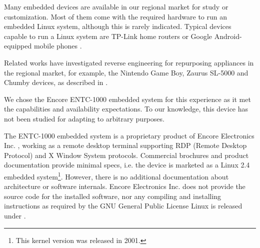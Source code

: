\documentclass[conference]{IEEEtran}
\newcommand{\nota}[1]{}
\begin{document}
\nota{Existen decenas de dispositivos embebidos en el mercado regional,
que pueden adquirirse para su estudio y adaptación. Y,
aunque muchas veces no se encuentren visiblemente etiquetados o documentados,
gran parte de estos sistemas contienen el hardware necesario
para ejecutar un sistema operativo Linux embebido. Ejemplos de estos dispositivos
capaces de ejecutar un sistema Linux son los routers hogareños TP-Link,
y los teléfonos móviles con sistema Google Android \cite{android}.
}
Many embedded devices are available in our regional market for study or customization. Most of them come with the required hardware to run an embedded Linux system, although this is rarely indicated.
Typical devices capable to run a Linux system are TP-Link home routers or Google Android-equipped mobile phones \cite{android, tplink}.

Related works have investigated
reverse engineering for repurposing appliances in the regional market,
for example, the Nintendo Game Boy, Zaurus SL-5000 and Chumby devices,
as described in \cite{camargo1, camargo2, castillo1}.

We chose the Encore ENTC-1000 embedded system for this experience
as it met the capabilities and availability expectations. To our
knowledge, this device has not been studied for adapting to
arbitrary purposes.





\nota{
El sistema embebido ENTC-1000 es un producto propietario de Encore Electronics Inc \cite{encore},
que funciona como una terminal de escritorio remoto, soportando
los protocolos RDP (Remote-Desktop-Protocol) y Xwindow. Si bien el folleto
comercial y su documentación proveen especificaciones mínimas,
esto es, se publicita como un sistema con Linux embebido kernel 2.4 
\footnote{Año 2001}, no existe información adicional de la arquitectura o funcionamiento
interno del software. Tampoco provee, Encore Electronic Inc.,
el código fuente del software instalado, ni las instrucciones
para su compilación e instalación (como es requerido por la licencia GPL de Linux \cite{gpl}).
}

The ENTC-1000 embedded system is a proprietary product of Encore Electronics Inc. \cite{encore},
working as a remote desktop terminal supporting RDP (Remote Desktop Protocol) and X Window System protocols. Commercial brochures and product documentation provide minimal specs, i.e. the device is marketed as a Linux 2.4 embedded system\footnote{This kernel version was released in 2001.}. However, there is no additional documentation about architecture or software internals. Encore Electronics Inc. does not provide the source code for the installed software, nor any compiling and installing instructions as required by the
GNU General Public License Linux is released under \cite{gpl}.
\end{document}
